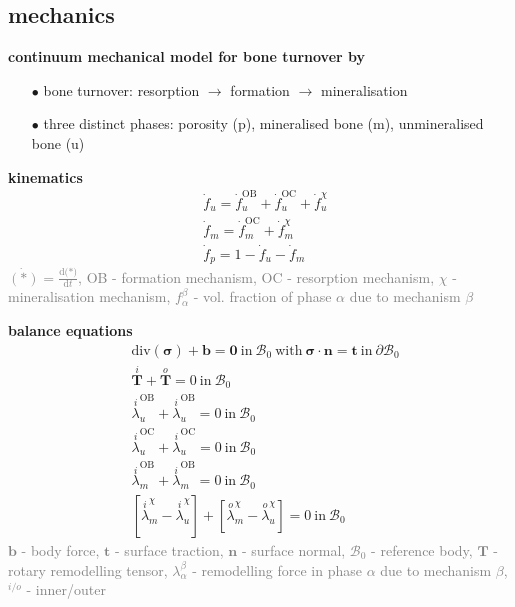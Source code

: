 \documentclass[%
aspectratio=169,  %
]{beamer}
\begin{document}
\subsection{mechanics}
\begin{frame}
\textbf{continuum mechanical model for bone turnover by \cite{Sansalone.2021}}
\begin{itemize}
\item[$\bullet$] bone turnover: resorption $\rightarrow$ formation $\rightarrow$ mineralisation
\item[$\bullet$] three distinct phases: porosity (p), mineralised bone (m), unmineralised bone (u)
\end{itemize}
\textbf{kinematics}
\begin{subequations}
	\begin{align}
		&\dot{f}_u = \dot{f}_u^\text{OB} + \dot{f}_u^\text{OC} + \dot{f}_u^{\chi} \\
		&\dot{f}_m = \dot{f}_m^\text{OC} + \dot{f}_m^{\chi} \\
		&\dot{f}_p = 1 - \dot{f}_u - \dot{f}_m
	\end{align}
\end{subequations}
\textcolor{gray}{$\dot{(*)} = \frac{\text{d(*)}}{\text{d}t}$, OB - formation mechanism, OC - resorption mechanism, $\chi$ - mineralisation mechanism, $f_\alpha^\beta$ - vol. fraction of phase $\alpha$ due to mechanism $\beta$}
\end{frame}

\begin{frame}
\textbf{balance equations}
\begin{subequations}
	\begin{align}
		& \text{div} (\bm{\sigma}) + \mathbf{b} = \mathbf{0} ~\text{in} ~ \mathcal{B}_0 ~ \text{with} ~\bm{\sigma} \cdot \mathbf{n} = \mathbf{t}  ~\text{in} ~\partial \mathcal{B}_0 \\
		& \overset{i}{\mathbf{T}} + \overset{o}{\mathbf{T}} = 0~\text{in} ~ \mathcal{B}_0 \\
		& \overset{i}{\lambda}^\text{OB}_u + \overset{i}{\lambda}^\text{OB}_u = 0 ~\text{in} ~ \mathcal{B}_0\\
		& \overset{i}{\lambda}^\text{OC}_u + \overset{i}{\lambda}^\text{OC}_u = 0 ~\text{in} ~ \mathcal{B}_0\\
		& \overset{i}{\lambda}^\text{OB}_m + \overset{i}{\lambda}^\text{OB}_m = 0 ~\text{in} ~ \mathcal{B}_0\\
		& [\overset{i}{\lambda}^{\chi}_m-\overset{i}{\lambda}^{\chi}_u] +  [\overset{o}{\lambda}^{\chi}_m-\overset{o}{\lambda}^{\chi}_u] = 0 ~\text{in} ~ \mathcal{B}_0
	\end{align}
	\label{eq:model5-balance}
\end{subequations}
\textcolor{gray}{$\mathbf{b}$ - body force, $\mathbf{t}$ - surface traction, $\mathbf{n}$ - surface normal, $\mathcal{B}_0$ - reference body, $\mathbf{T}$ - rotary remodelling tensor, $\lambda_\alpha^\beta$ - remodelling force in phase $\alpha$ due to mechanism $\beta$, $^{i/o}$ - inner/outer}
\end{frame}
\end{document}
